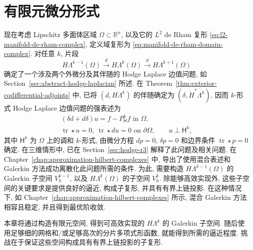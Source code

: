 \clearpage\setcounter{chapter}{6}
\chapter{{有限元微分形式}}\label{chap:finite-element-differential-forms}

{现在考虑 Lipschitz 多面体区域 $\Omega\subset\mathbb R^n$, 以及它的 $L^2$ de Rham 复形 \eqref{eq:l2-manifold-de-rham-complex}, 定义域复形为 \eqref{eq:manifold-de-rham-domain-complex}. 对任意 $k$, 片段}
\begin{equation}\label{eq:finite-element-forms-short-complex}
H\Lambda^{k-1}(\Omega)\xrightarrow{d}H\Lambda^k(\Omega)\xrightarrow{d}H\Lambda^{k+1}(\Omega)
\end{equation}
{确定了一个涉及两个外微分及其伴随的 Hodge Laplace 边值问题, 如 Section~\ref{sec:abstract-hodge-laplacian} 所述. 在 Theorem~\ref{thm:exterior-codifferential-adjoints} 中, 已将 $(d,H\Lambda^k)$ 的伴随确定为 $(\delta,\mathring H^*\Lambda^k)$, 因而 $k$-形式 Hodge Laplace 边值问题的强表述为}
\begin{equation}\label{eq:finite-element-forms-hodge-strong}
\begin{gathered}
(\delta d+d\delta)u=f-P_{\mathsf H}^kf\text{ in }\Omega,\\
\operatorname{tr}\star u=0,\ \operatorname{tr}\star du=0\text{ on }\partial\Omega,\qquad u\perp\mathsf H^k,
\end{gathered}
\end{equation}
{其中 $\mathsf H^k$ 为 $\Omega$ 上的调和 $k$-形式, 由微分方程 $dp=0$, $\delta p=0$ 和边界条件 $\operatorname{tr}\star p=0$ 确定. 在三维情形中, 已在 Section~\ref{sec:hodge-r3} 解释了此问题及相关问题. 在 Chapter~\ref{chap:approximation-hilbert-complexes} 中, 导出了使用混合表述和 Galerkin 方法成功离散化此问题所需的条件. 为此, 需要构造 $H\Lambda^{k-1}(\Omega)$ 的 Galerkin 子空间 $V_h^{k-1}$, 以及 $H\Lambda^k(\Omega)$ 的子空间 $V_h^k$. 除能够高效实现外, 这些子空间的关键要求是提供良好的逼近, 构成子复形, 并具有有界上链投影. 在这种情况下, 如 Chapter~\ref{chap:approximation-hilbert-complexes} 所示, 混合 Galerkin 方法相容且稳定, 并且得到最优阶收敛.}

{本章将通过构造有限元空间, 得到可高效实现的 $H\Lambda^k$ 的 Galerkin 子空间. 随后使用足够细的网格和/或足够高次的分片多项式形函数, 就能得到所需的逼近程度. 挑战在于保证这些空间构成具有有界上链投影的子复形.}


